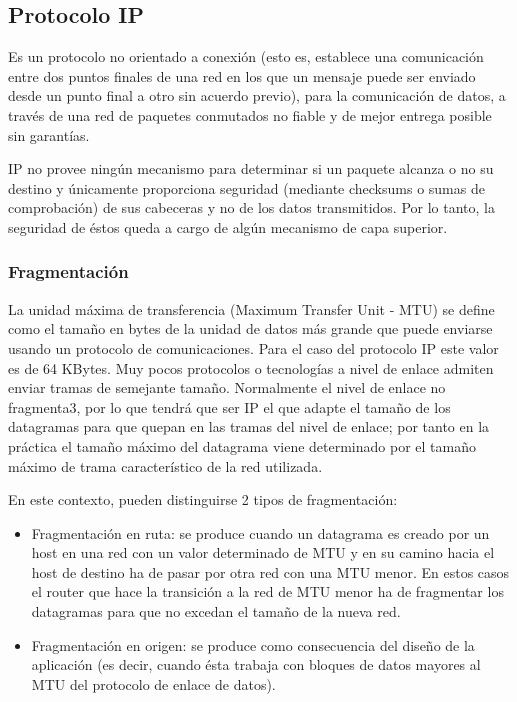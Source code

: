 \subsection{Protocolo IP}

Es un protocolo no orientado a conexión (esto es, establece una comunicación entre dos puntos finales de una red en los que un mensaje puede ser enviado desde un punto final a otro sin acuerdo previo), para la comunicación de datos, a través de una red de paquetes conmutados no fiable y de mejor entrega posible sin garantías.

 IP no provee ningún mecanismo para determinar si un paquete alcanza o no su destino y únicamente proporciona seguridad (mediante checksums o sumas de comprobación) de sus cabeceras y no de los datos transmitidos. Por lo tanto, la seguridad de éstos queda a cargo de algún mecanismo de capa superior.

\subsubsection{Fragmentación}

La unidad máxima de transferencia (Maximum Transfer Unit - MTU) se define como el tamaño en bytes de la unidad de datos más grande que puede enviarse usando un protocolo de comunicaciones. Para el caso del protocolo IP este valor es de 64 KBytes. Muy pocos protocolos o tecnologías a nivel de enlace admiten enviar tramas de semejante tamaño. Normalmente el nivel de enlace no fragmenta3, por lo que tendrá que ser IP el que adapte el tamaño de los datagramas para que quepan en las tramas del nivel de enlace; por tanto en la práctica el tamaño máximo del datagrama viene determinado por el tamaño máximo de trama característico de la red utilizada.

En este contexto, pueden distinguirse 2 tipos de fragmentación:

\begin{itemize}
	\item Fragmentación en ruta: se produce cuando un datagrama es creado por un host en una red con un valor determinado de MTU y en su camino hacia el host de destino ha de pasar por otra red con una MTU menor. En estos casos el router que hace la transición a la red de MTU menor ha de fragmentar los datagramas para que no excedan el tamaño de la nueva red.
	\item Fragmentación en origen: se produce como consecuencia del diseño de la aplicación (es decir, cuando ésta trabaja con bloques de datos mayores al MTU del protocolo de enlace de datos).	
\end{itemize}

